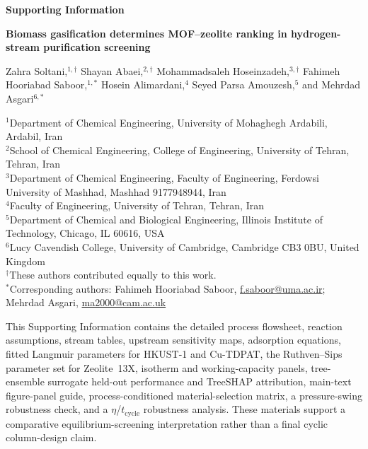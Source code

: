 \documentclass[11pt,a4paper]{article}
\begin{document}
\begin{titlepage}
\centering
\vspace*{1.5cm}

{\Large\bfseries Supporting Information\par}

\vspace{0.8cm}

{\large\bfseries Biomass gasification determines MOF--zeolite ranking in hydrogen-stream purification screening\par}

\vspace{0.8cm}

{\normalsize
Zahra Soltani,$^{1,\dagger}$
Shayan Abaei,$^{2,\dagger}$
Mohammadsaleh Hoseinzadeh,$^{3,\dagger}$
Fahimeh Hooriabad Saboor,$^{1,*}$
Hosein Alimardani,$^{4}$
Seyed Parsa Amouzesh,$^{5}$
and Mehrdad Asgari$^{6,*}$\par}

\vspace{0.8cm}

\begin{minipage}{0.94\textwidth}
\small
\centering
$^{1}$Department of Chemical Engineering, University of Mohaghegh Ardabili, Ardabil, Iran\\
$^{2}$School of Chemical Engineering, College of Engineering, University of Tehran, Tehran, Iran\\
$^{3}$Department of Chemical Engineering, Faculty of Engineering, Ferdowsi University of Mashhad, Mashhad 9177948944, Iran\\
$^{4}$Faculty of Engineering, University of Tehran, Tehran, Iran\\
$^{5}$Department of Chemical and Biological Engineering, Illinois Institute of Technology, Chicago, IL 60616, USA\\
$^{6}$Lucy Cavendish College, University of Cambridge, Cambridge CB3 0BU, United Kingdom\\[0.8em]

$^{\dagger}$These authors contributed equally to this work.\\[0.4em]
$^{*}$Corresponding authors: Fahimeh Hooriabad Saboor,
\href{mailto:f.saboor@uma.ac.ir}{f.saboor@uma.ac.ir};
Mehrdad Asgari,
\href{mailto:ma2000@cam.ac.uk}{ma2000@cam.ac.uk}
\end{minipage}

\vfill

{\small This Supporting Information contains the detailed process flowsheet,
reaction assumptions, stream tables, upstream sensitivity maps, adsorption
equations, fitted Langmuir parameters for HKUST-1 and Cu-TDPAT, the
Ruthven--Sips parameter set for Zeolite~13X, isotherm and working-capacity
panels, tree-ensemble surrogate held-out performance and TreeSHAP attribution,
main-text figure-panel guide, process-conditioned material-selection matrix,
a pressure-swing robustness check, and a $\eta$/$t_{\mathrm{cycle}}$
robustness analysis. These materials support a comparative equilibrium-screening
interpretation rather than a final cyclic column-design claim.}

\end{titlepage}
\end{document}
